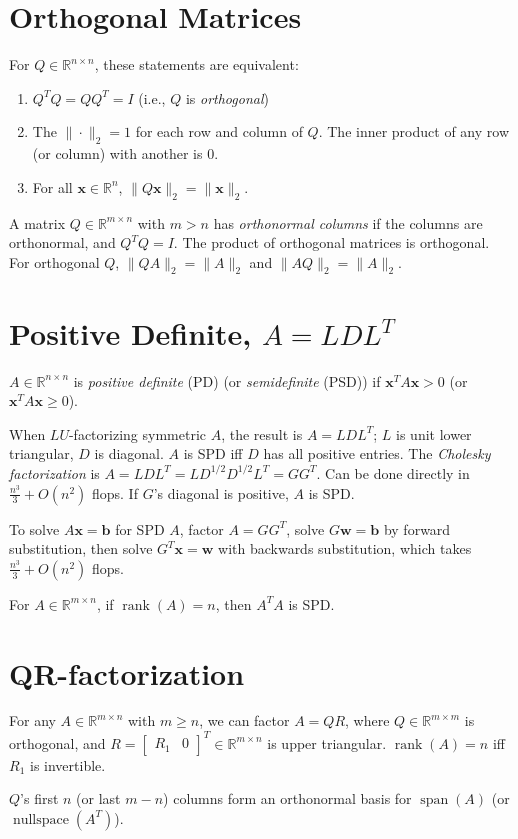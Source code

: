 \documentclass[landscape,10pt,letterpaper]{article}
\newcommand{\heading}[1]{\vspace{-1.5em} \section*{#1} \vspace{-1.0em}}
\begin{document}
\begin{multicols}{4}
\heading{Orthogonal Matrices}

For $Q \in \mathbb{R}^{n \times n}$, these statements are equivalent:
\begin{enumerate}[topsep=0pt, partopsep=0pt, itemsep=-4pt]
\item $Q^TQ = QQ^T = I$ (i.e., $Q$ is \emph{orthogonal})
\item The $\| \cdot \|_2=1$ for each row and column of $Q$.  The inner product of any row (or column) with another is $0$.
\item For all $\mathbf{x} \in \mathbb{R}^n$, $\| Q \mathbf{x} \|_2 = \| \mathbf{x} \|_2$.
\end{enumerate}
A matrix $Q \in \mathbb{R}^{m \times n}$ with $m > n$ has \emph{orthonormal columns} if the columns are orthonormal, and $Q^TQ=I$.  The product of orthogonal matrices is orthogonal.  For orthogonal $Q$, $\|QA\|_2 = \|A\|_2$ and $\|AQ\|_2 = \|A\|_2$.

\heading{Positive Definite, $A=LDL^T$}

$A \in \mathbb{R}^{n \times n}$ is \emph{positive definite} (PD) (or \emph{semidefinite} (PSD)) if $\mathbf{x}^T A \mathbf{x} > 0$ (or $\mathbf{x}^T A \mathbf{x} \geq 0$).

When $LU$-factorizing symmetric $A$, the result is $A=LDL^T$; $L$ is unit lower triangular, $D$ is diagonal.  $A$ is SPD iff $D$ has all positive entries.  The \emph{Cholesky factorization} is $A = LDL^T = LD^{1/2} D^{1/2}L^T = GG^T$.  Can be done directly in $\frac{n^3}{3} + O(n^2)$ flops.  If $G$'s diagonal is positive, $A$ is SPD.

To solve $A \mathbf{x} = \mathbf{b}$ for SPD $A$, factor $A = GG^T$, solve $G \mathbf{w} = \mathbf{b}$ by forward substitution, then solve $G^T \mathbf{x} = \mathbf{w}$ with backwards substitution, which takes $\frac{n^3}{3} + O(n^2)$ flops.

For $A \in \mathbb{R}^{m \times n}$, if $\mathop{rank}(A)=n$, then $A^TA$ is SPD.

\heading{QR-factorization}

For any $A \in \mathbb{R}^{m \times n}$ with $m \geq n$, we can factor $A = QR$, where $Q \in \mathbb{R}^{m \times m}$ is orthogonal, and $R = [\begin{array}{cc} R_1 & 0 \end{array}]^T \in \mathbb{R}^{m \times n}$ is upper triangular.  $\mathop{rank}(A)=n$ iff $R_1$ is invertible.

$Q$'s first $n$ (or last $m-n$) columns form an orthonormal basis for $\mathop{span}(A)$ (or $\mathop{nullspace}(A^T)$).


\end{multicols}
\end{document}
